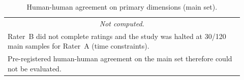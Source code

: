\begin{table}[htbp]
  \centering\small
  \caption{Human-human agreement on primary dimensions (main set).}
  \label{tab:human_iaa}
  \begin{tabular}{@{}p{0.92\linewidth}@{}}
    \toprule
    \multicolumn{1}{c}{\textit{Not computed.}} \\
    \addlinespace
    Rater~B did not complete ratings and the study was halted at 30/120 main samples for Rater~A (time constraints). \\
    Pre-registered human-human agreement on the main set therefore could not be evaluated. \\
    \bottomrule
  \end{tabular}
\end{table}
